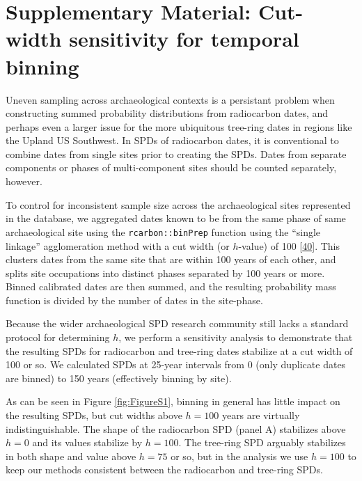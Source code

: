 \documentclass[
]{sa}
\begin{document}
\newpage

\hypertarget{supplementary-material-cut-width-sensitivity-for-temporal-binning}{%
\section*{Supplementary Material: Cut-width sensitivity for temporal binning}\label{supplementary-material-cut-width-sensitivity-for-temporal-binning}}

Uneven sampling across archaeological contexts is a persistant problem when constructing summed probability distributions from radiocarbon dates, and perhaps even a larger issue for the more ubiquitous tree-ring dates in regions like the Upland US Southwest. In SPDs of radiocarbon dates, it is conventional to combine dates from single sites prior to creating the SPDs. Dates from separate components or phases of multi-component sites should be counted separately, however.

To control for inconsistent sample size across the archaeological sites represented in the database, we aggregated dates known to be from the same phase of same archaeological site using the \texttt{rcarbon::binPrep} function using the ``single linkage'' agglomeration method with a cut width (or \(h\)-value) of 100 {[}\protect\hyperlink{ref-rcarbon}{40}{]}. This clusters dates from the same site that are within 100 years of each other, and splits site occupations into distinct phases separated by 100 years or more. Binned calibrated dates are then summed, and the resulting probability mass function is divided by the number of dates in the site-phase.

Because the wider archaeological SPD research community still lacks a standard protocol for determining \(h\), we perform a sensitivity analysis to demonstrate that the resulting SPDs for radiocarbon and tree-ring dates stabilize at a cut width of 100 or so. We calculated SPDs at 25-year intervals from 0 (only duplicate dates are binned) to 150 years (effectively binning by site).

As can be seen in Figure \ref{fig:FigureS1}, binning in general has little impact on the resulting SPDs, but cut widths above \(h=100\) years are virtually indistinguishable. The shape of the radiocarbon SPD (panel A) stabilizes above \(h=0\) and its values stabilize by \(h=100\). The tree-ring SPD arguably stabilizes in both shape and value above \(h=75\) or so, but in the analysis we use \(h=100\) to keep our methods consistent between the radiocarbon and tree-ring SPDs.
\end{document}
